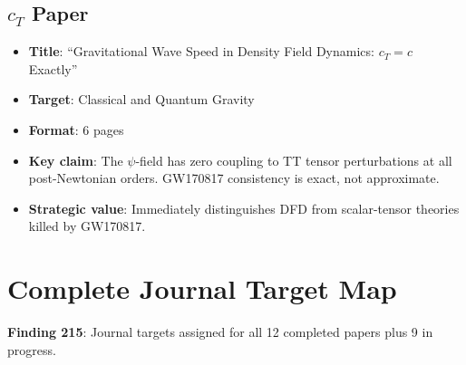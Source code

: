 \documentclass[11pt,a4paper]{article}
\begin{document}
\subsection{$c_T$ Paper}

\begin{itemize}[nosep]
\item \textbf{Title}: ``Gravitational Wave Speed in Density Field Dynamics: $c_T = c$ Exactly''
\item \textbf{Target}: Classical and Quantum Gravity
\item \textbf{Format}: 6 pages
\item \textbf{Key claim}: The $\psi$-field has zero coupling to TT tensor perturbations at all post-Newtonian orders. GW170817 consistency is exact, not approximate.
\item \textbf{Strategic value}: Immediately distinguishes DFD from scalar-tensor theories killed by GW170817.
\end{itemize}

\section{Complete Journal Target Map}

\textbf{Finding 215}: Journal targets assigned for all 12 completed papers plus 9 in progress.
\end{document}
